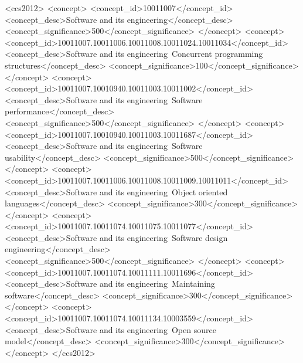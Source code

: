 \documentclass[acmtog, authorversion]{acmart}
\begin{document}
\begin{CCSXML}
\begin{CCSXML}
<ccs2012>
<concept>
<concept_id>10011007</concept_id>
<concept_desc>Software and its engineering</concept_desc>
<concept_significance>500</concept_significance>
</concept>
<concept>
<concept_id>10011007.10011006.10011008.10011024.10011034</concept_id>
<concept_desc>Software and its engineering~Concurrent programming structures</concept_desc>
<concept_significance>100</concept_significance>
</concept>
<concept>
<concept_id>10011007.10010940.10011003.10011002</concept_id>
<concept_desc>Software and its engineering~Software performance</concept_desc>
<concept_significance>500</concept_significance>
</concept>
<concept>
<concept_id>10011007.10010940.10011003.10011687</concept_id>
<concept_desc>Software and its engineering~Software usability</concept_desc>
<concept_significance>500</concept_significance>
</concept>
<concept>
<concept_id>10011007.10011006.10011008.10011009.10011011</concept_id>
<concept_desc>Software and its engineering~Object oriented languages</concept_desc>
<concept_significance>300</concept_significance>
</concept>
<concept>
<concept_id>10011007.10011074.10011075.10011077</concept_id>
<concept_desc>Software and its engineering~Software design engineering</concept_desc>
<concept_significance>500</concept_significance>
</concept>
<concept>
<concept_id>10011007.10011074.10011111.10011696</concept_id>
<concept_desc>Software and its engineering~Maintaining software</concept_desc>
<concept_significance>300</concept_significance>
</concept>
<concept>
<concept_id>10011007.10011074.10011134.10003559</concept_id>
<concept_desc>Software and its engineering~Open source model</concept_desc>
<concept_significance>300</concept_significance>
</concept>
</ccs2012>
\end{CCSXML}

\end{CCSXML}
\end{document}
